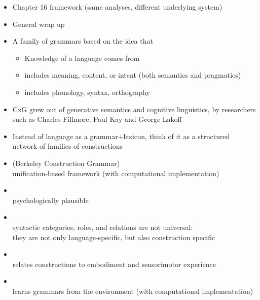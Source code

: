 \documentclass[a4paper,landscape,headrule,footrule]{foils}
\begin{document}
\avmfont{\it}
\maketitle





\begin{itemize}
\item Chapter 16 framework (same analyses, 
different underlying system)
\item General wrap up
\end{itemize}


\begin{itemize}
\item A family of grammars based on the idea that
  \begin{itemize}
  \item Knowledge of a language comes from 
  \item {} includes meaning, content, or intent 
    (both semantics and pragmatics)
  \item {} includes phonology, syntax, orthography
  \end{itemize}
\item CxG grew out of generative semantics and cognitive linguistics,
  by researchers such as Charles Fillmore, Paul Kay and George Lakoff
\item Instead of language as a grammar+lexicon, think of it as a
  structured network of families of constructions
\end{itemize}


\begin{itemize}
\item {} (Berkeley Construction Grammar)
  \\  unification-based framework (with computational implementation)
\item {}
  \\ psychologically plausible
\item {}
  \\ syntactic categories, roles, and relations are not universal: 
  \\ they are not only language-specific, but also construction specific 
\item {}
  \\ relates constructions to embodiment and sensorimotor experience
\item {}
  \\ learns grammars from the environment (with computational implementation)
\end{itemize}
\end{document}
